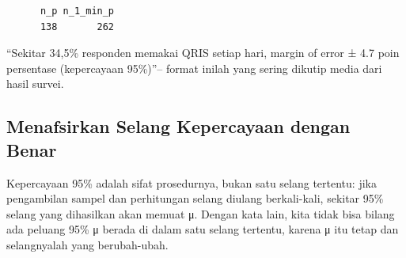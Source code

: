 \documentclass[
  indonesian,
  letterpaper,
]{book}
\begin{document}
\begin{verbatim}
      n_p n_1_min_p 
      138       262 
\end{verbatim}

``Sekitar 34,5\% responden memakai QRIS setiap hari, margin of error ±
4.7 poin persentase (kepercayaan 95\%)''-- format inilah yang sering
dikutip media dari hasil survei.

\subsection{Menafsirkan Selang Kepercayaan dengan
Benar}\label{menafsirkan-selang-kepercayaan-dengan-benar}

Kepercayaan 95\% adalah sifat prosedurnya, bukan satu selang tertentu:
jika pengambilan sampel dan perhitungan selang diulang berkali-kali,
sekitar 95\% selang yang dihasilkan akan memuat μ. Dengan kata lain,
kita tidak bisa bilang ada peluang 95\% μ berada di dalam satu selang
tertentu, karena μ itu tetap dan selangnyalah yang berubah-ubah.
\end{document}
